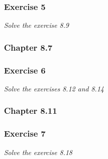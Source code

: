 \subsubsection*{Exercise 5}
\textit{Solve the exercise 8.9} \\

\subsubsection{Chapter 8.7}

\subsubsection*{Exercise 6}
\textit{Solve the exercises 8.12 and 8.14} \\

\subsubsection{Chapter 8.11}

\subsubsection*{Exercise 7}
\textit{Solve the exercise 8.18} \\

